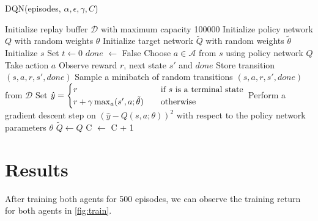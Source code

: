\documentclass{article}
\begin{document}
\begin{algorithm}[H]
      \caption{DQN(episodes, \(\alpha, \epsilon, \gamma, C\))}
      \label{alg:dqn}
      \begin{algorithmic}[1]
            \State Initialize replay buffer \(\mathcal{D}\) with maximum capacity 100000
            \State Initialize policy network \(Q\) with random weights \(\theta\)
            \State Initialize target network \(\tilde{Q}\) with random weights \(\tilde{\theta}\) 
            \State Initialize \(s\)
            \State Set \(t \leftarrow 0\) 
            \State \(done\) \(\leftarrow\) False
            \State Choose \(a \in \mathcal{A}\) from \(s\) using policy network \(Q\) 
            \State Take action \(a\)
            \State Observe reward \(r\), next state \(s'\) and \(done\)
            \State Store transition \((s, a, r, s', done)\)
            \State Sample a minibatch of random transitions \((s, a, r, s', done)\) from \(\mathcal{D}\)
            \State Set \(\hat{y} =
            \begin{cases}
                  r                                                  & \quad \text{if }s \text{ is a terminal state} \\
                  r + \gamma \max_a \title{Q}(s', a; \tilde{\theta}) & \quad \text{otherwise}
            \end{cases}\) 
            \State Perform a gradient descent step on \(\left(\hat{y} - Q(s, a; \theta)\right)^2\) with respect to the policy network parameters \(\theta\)
            \State \(\tilde{Q} \leftarrow Q\) 
            \EndIf
            \State C \(\leftarrow\) C + 1
            \EndWhile
            \EndFor
      \end{algorithmic}
\end{algorithm}

\section{Results}

After training both agents for 500 episodes, we can observe the training return
for both agents in \cref{fig:train}.
\end{document}

